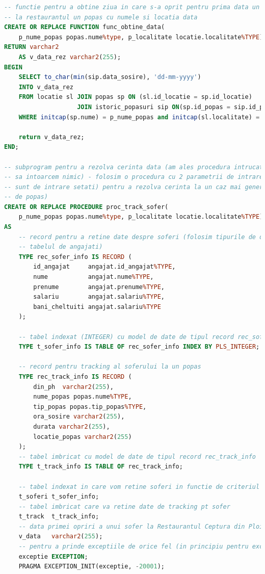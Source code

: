 \documentclass[12pt, a4paper]{article}
\begin{document}
\begin{lstlisting}[language=SQL]
-- functie pentru a obtine ziua in care s-a oprit pentru prima data un sofer
-- la restaurantul un popas cu numele si locatia data
CREATE OR REPLACE FUNCTION func_obtine_data(
    p_nume_popas popas.nume%type, p_localitate locatie.localitate%TYPE)
RETURN varchar2
    AS v_data_rez varchar2(255);
BEGIN
    SELECT to_char(min(sip.data_sosire), 'dd-mm-yyyy')
    INTO v_data_rez
    FROM locatie sl JOIN popas sp ON (sl.id_locatie = sp.id_locatie)
                    JOIN istoric_popasuri sip ON(sp.id_popas = sip.id_popas)
    WHERE initcap(sp.nume) = p_nume_popas and initcap(sl.localitate) = p_localitate;
    
    return v_data_rez;
END;

-- subprogram pentru a rezolva cerinta data (am ales procedura intrucat nu trebuie
-- sa intoarcem nimic) - folosim o procedura cu 2 parametrii de intrare(default 
-- sunt de intrare setati) pentru a rezolva cerinta la un caz mai general (indiferent
-- de popas)
CREATE OR REPLACE PROCEDURE proc_track_sofer(
    p_nume_popas popas.nume%type, p_localitate locatie.localitate%TYPE)
AS
    -- record pentru a retine date despre soferi (folosim tipurile de date din
    -- tabelul de angajati)
    TYPE rec_sofer_info IS RECORD (
        id_angajat     angajat.id_angajat%TYPE,
        nume           angajat.nume%TYPE,
        prenume        angajat.prenume%TYPE,
        salariu        angajat.salariu%TYPE,
        bani_cheltuiti angajat.salariu%TYPE
    );
    
    -- tabel indexat (INTEGER) cu model de date de tipul record rec_sofer_info
    TYPE t_sofer_info IS TABLE OF rec_sofer_info INDEX BY PLS_INTEGER;
    
    -- record pentru tracking al soferului la un popas
    TYPE rec_track_info IS RECORD (
        din_ph  varchar2(255),
        nume_popas popas.nume%TYPE,
        tip_popas popas.tip_popas%TYPE,
        ora_sosire varchar2(255),
        durata varchar2(255),
        locatie_popas varchar2(255)
    );
    -- tabel imbricat cu model de date de tipul record rec_track_info
    TYPE t_track_info IS TABLE OF rec_track_info;
    
    -- tabel indexat in care vom retine soferi in functie de criteriul stabilit
    t_soferi t_sofer_info;
    -- tabel imbricat care va retine date de tracking pt sofer
    t_track  t_track_info;
    -- data primei opriri a unui sofer la Restaurantul Ceptura din Ploiesti
    v_data   varchar2(255);
    -- pentru a prinde exceptiile de orice fel (in principiu pentru exceptiile aplicatiei)
    exceptie EXCEPTION;
    PRAGMA EXCEPTION_INIT(exceptie, -20001);
    

\end{lstlisting}
\end{document}
